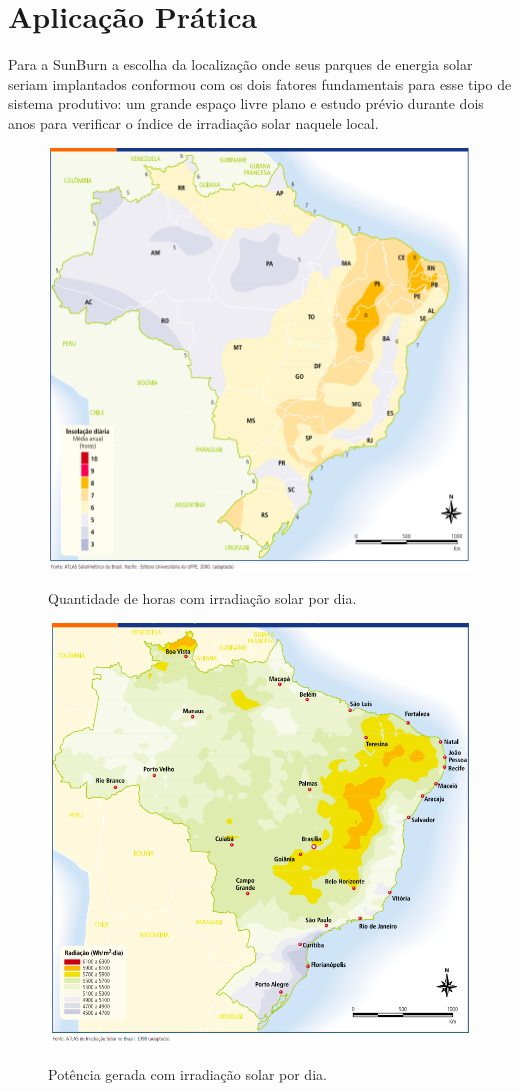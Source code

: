 \section{Aplicação Prática}
\label{sec:projetos_de_novas_aplicacao}


Para a SunBurn a escolha da localização onde seus parques de energia solar seriam implantados conformou com os dois fatores fundamentais para esse tipo de sistema produtivo: um grande espaço livre plano e estudo prévio durante dois anos para verificar o índice de irradiação solar naquele local.

\begin{figure}[H]
    \centering
    \caption{Quantidade de horas com irradiação solar por dia.}
    \includegraphics[width=.6\textwidth]{images/insolacao_estudo.png}
    \label{fig:irradiacao_solar_h}
\end{figure}

\begin{figure}[H]
    \centering
    \caption{Potência gerada com irradiação solar por dia.}
    \includegraphics[width=.6\textwidth]{images/radiacao_solar_diaria.png}
    \label{fig:irradiacao_solar_mwh}
\end{figure}

